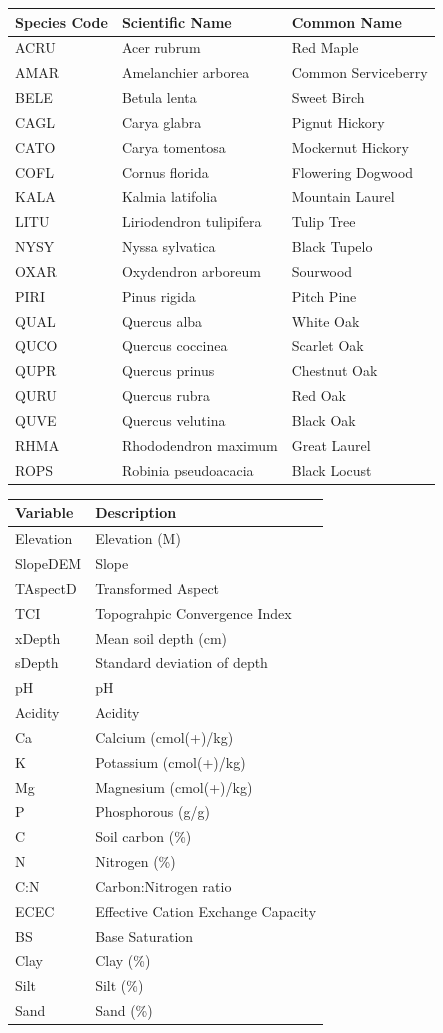 \documentclass[
  12pt,
]{article}
\begin{document}
\begin{longtable}[]{@{}lll@{}}
\toprule
Species Code & Scientific Name & Common Name\tabularnewline
\midrule
\endhead
ACRU & Acer rubrum & Red Maple\tabularnewline
AMAR & Amelanchier arborea & Common Serviceberry\tabularnewline
BELE & Betula lenta & Sweet Birch\tabularnewline
CAGL & Carya glabra & Pignut Hickory\tabularnewline
CATO & Carya tomentosa & Mockernut Hickory\tabularnewline
COFL & Cornus florida & Flowering Dogwood\tabularnewline
KALA & Kalmia latifolia & Mountain Laurel\tabularnewline
LITU & Liriodendron tulipifera & Tulip Tree\tabularnewline
NYSY & Nyssa sylvatica & Black Tupelo\tabularnewline
OXAR & Oxydendron arboreum & Sourwood\tabularnewline
PIRI & Pinus rigida & Pitch Pine\tabularnewline
QUAL & Quercus alba & White Oak\tabularnewline
QUCO & Quercus coccinea & Scarlet Oak\tabularnewline
QUPR & Quercus prinus & Chestnut Oak\tabularnewline
QURU & Quercus rubra & Red Oak\tabularnewline
QUVE & Quercus velutina & Black Oak\tabularnewline
RHMA & Rhododendron maximum & Great Laurel\tabularnewline
ROPS & Robinia pseudoacacia & Black Locust\tabularnewline
\bottomrule
\end{longtable}

\begin{longtable}[]{@{}ll@{}}
\toprule
Variable & Description\tabularnewline
\midrule
\endhead
Elevation & Elevation (M)\tabularnewline
SlopeDEM & Slope\tabularnewline
TAspectD & Transformed Aspect\tabularnewline
TCI & Topograhpic Convergence Index\tabularnewline
xDepth & Mean soil depth (cm)\tabularnewline
sDepth & Standard deviation of depth\tabularnewline
pH & pH\tabularnewline
Acidity & Acidity\tabularnewline
Ca & Calcium (cmol(+)/kg)\tabularnewline
K & Potassium (cmol(+)/kg)\tabularnewline
Mg & Magnesium (cmol(+)/kg)\tabularnewline
P & Phosphorous (g/g)\tabularnewline
C & Soil carbon (\%)\tabularnewline
N & Nitrogen (\%)\tabularnewline
C:N & Carbon:Nitrogen ratio\tabularnewline
ECEC & Effective Cation Exchange Capacity\tabularnewline
BS & Base Saturation\tabularnewline
Clay & Clay (\%)\tabularnewline
Silt & Silt (\%)\tabularnewline
Sand & Sand (\%)\tabularnewline
\bottomrule
\end{longtable}
\end{document}

